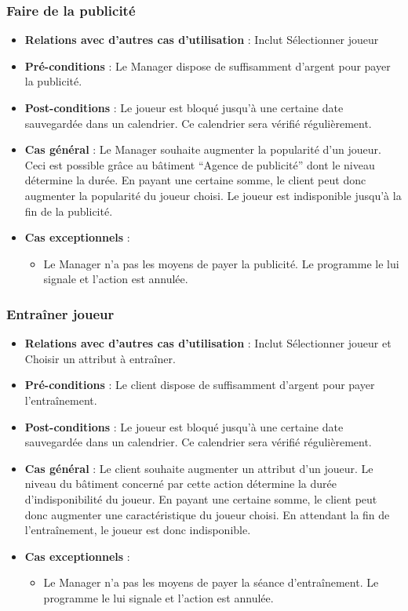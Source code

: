 \documentclass[a4paper,titlepage]{scrreprt}
\begin{document}
    \subsubsection{Faire de la publicité}
      \begin{itemize}
        \item \textbf{Relations avec d'autres cas d'utilisation}  : Inclut Sélectionner joueur
        \item \textbf{Pré-conditions} : Le Manager dispose de suffisamment d’argent pour payer la publicité.
        \item \textbf{Post-conditions} : Le joueur est bloqué jusqu'à une certaine date sauvegardée dans un calendrier. Ce calendrier sera vérifié régulièrement.
        \item \textbf{Cas général} : Le Manager souhaite augmenter la popularité d'un joueur. Ceci est possible grâce au bâtiment \enquote{Agence de publicité} dont le niveau détermine la durée. En payant une certaine somme, le client peut donc augmenter la popularité du joueur choisi. Le joueur est indisponible jusqu’à la fin de la publicité.

        \item \textbf{Cas exceptionnels} :
        \begin{itemize}
            \item Le Manager n'a pas les moyens de payer la publicité. Le programme le lui signale et l'action est annulée.
          \end{itemize}
      \end{itemize}
    \subsubsection{Entraîner joueur}
      \begin{itemize}
        \item \textbf{Relations avec d'autres cas d'utilisation}  : Inclut Sélectionner joueur et Choisir un attribut à entraîner.
        \item \textbf{Pré-conditions} : Le client dispose de suffisamment d’argent pour payer l’entraînement.
        \item \textbf{Post-conditions} : Le joueur est bloqué jusqu'à une certaine date sauvegardée dans un calendrier. Ce calendrier sera vérifié régulièrement.
        \item \textbf{Cas général} : Le client souhaite augmenter un attribut  d’un joueur. Le niveau du bâtiment concerné par cette action détermine la durée d'indisponibilité du joueur. En payant une certaine somme, le client peut donc augmenter une caractéristique du joueur choisi. En attendant la fin de l’entraînement, le joueur est donc indisponible.
        \item \textbf{Cas exceptionnels} :
        \begin{itemize}
            \item Le Manager n'a pas les moyens de payer la séance d'entraînement. Le programme le lui signale et l'action est annulée.
          \end{itemize}
      \end{itemize}
\end{document}
